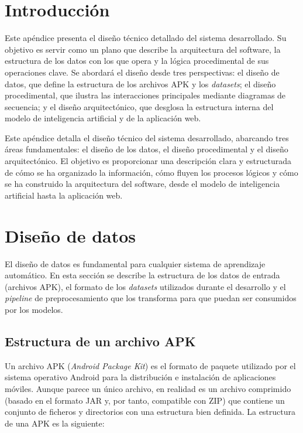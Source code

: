 
\section{Introducción}
Este apéndice presenta el diseño técnico detallado del sistema desarrollado. Su objetivo es servir como un plano que describe la arquitectura del software, la estructura de los datos con los que opera y la lógica procedimental de sus operaciones clave. Se abordará el diseño desde tres perspectivas: el diseño de datos, que define la estructura de los archivos APK y los \textit{datasets}; el diseño procedimental, que ilustra las interacciones principales mediante diagramas de secuencia; y el diseño arquitectónico, que desglosa la estructura interna del modelo de inteligencia artificial y de la aplicación web.

%

Este apéndice detalla el diseño técnico del sistema desarrollado, abarcando tres áreas fundamentales: el diseño de los datos, el diseño procedimental y el diseño arquitectónico. El objetivo es proporcionar una descripción clara y estructurada de cómo se ha organizado la información, cómo fluyen los procesos lógicos y cómo se ha construido la arquitectura del software, desde el modelo de inteligencia artificial hasta la aplicación web.

\section{Diseño de datos}

El diseño de datos es fundamental para cualquier sistema de aprendizaje automático. En esta sección se describe la estructura de los datos de entrada (archivos APK), el formato de los \textit{datasets} utilizados durante el desarrollo y el \textit{pipeline} de preprocesamiento que los transforma para que puedan ser consumidos por los modelos.

\subsection{Estructura de un archivo APK}
Un archivo APK (\textit{Android Package Kit}) es el formato de paquete utilizado por el sistema operativo Android para la distribución e instalación de aplicaciones móviles. Aunque parece un único archivo, en realidad es un archivo comprimido (basado en el formato JAR y, por tanto, compatible con ZIP) que contiene un conjunto de ficheros y directorios con una estructura bien definida. La estructura de una APK es la siguiente:\\

